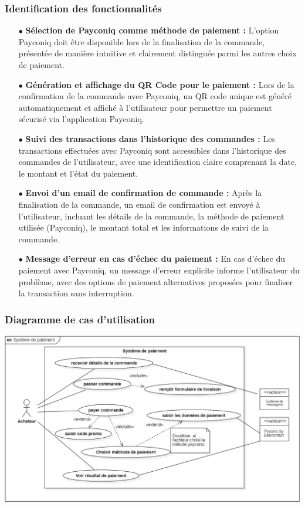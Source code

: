 \subsubsection{Identification des fonctionnalités}
\begin{itemize}
    \item [$\bullet$]\textbf{Sélection de Payconiq comme méthode de paiement :} L'option Payconiq doit être disponible lors de la finalisation de la commande, présentée de manière intuitive et clairement distinguée parmi les autres choix de paiement.
    \item [$\bullet$]\textbf{Génération et affichage du QR Code pour le paiement :} Lors de la confirmation de la commande avec Payconiq, un QR code unique est généré automatiquement et affiché à l'utilisateur pour permettre un paiement sécurisé via l'application Payconiq.
    \item [$\bullet$]\textbf{Suivi des transactions dans l'historique des commandes :} Les transactions effectuées avec Payconiq sont accessibles dans l'historique des commandes de l'utilisateur, avec une identification claire comprenant la date, le montant et l'état du paiement.
    \item [$\bullet$]\textbf{Envoi d'un email de confirmation de commande :} Après la finalisation de la commande, un email de confirmation est envoyé à l'utilisateur, incluant les détails de la commande, la méthode de paiement utilisée (Payconiq), le montant total et les informations de suivi de la commande.
    \item [$\bullet$]\textbf{Message d'erreur en cas d'échec du paiement :} En cas d'échec du paiement avec Payconiq, un message d'erreur explicite informe l'utilisateur du problème, avec des options de paiement alternatives proposées pour finaliser la transaction sans interruption.
\end{itemize}

\subsubsection{Diagramme de cas d’utilisation}
\begin{center}
    \centering
    \includegraphics[width=19cm]{Figures/usecase.jpg}
    \label{fig:usecase}
\end{center}


